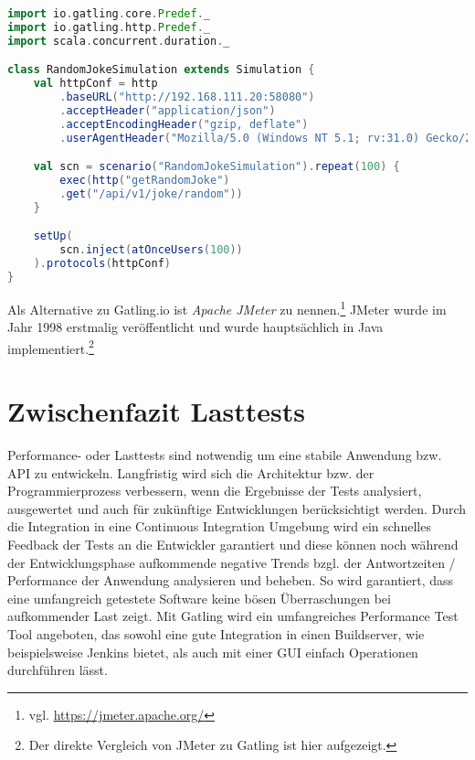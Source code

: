 \begin{minipage}{\linewidth}
\begin{lstlisting}[frame=single,caption=Testabfrage auf Schnittstelle in Gatling, label=testCodingSample, language=Scala]
import io.gatling.core.Predef._
import io.gatling.http.Predef._
import scala.concurrent.duration._

class RandomJokeSimulation extends Simulation {
    val httpConf = http
        .baseURL("http://192.168.111.20:58080")
        .acceptHeader("application/json")
        .acceptEncodingHeader("gzip, deflate")
        .userAgentHeader("Mozilla/5.0 (Windows NT 5.1; rv:31.0) Gecko/20100101 Firefox/31.0")

    val scn = scenario("RandomJokeSimulation").repeat(100) {
        exec(http("getRandomJoke")
        .get("/api/v1/joke/random"))
    }    

    setUp(
        scn.inject(atOnceUsers(100))
    ).protocols(httpConf)
}
\end{lstlisting}
\end{minipage}
Als Alternative zu Gatling.io ist \textit{Apache JMeter} zu nennen.\footnote{{} vgl. \url{https://jmeter.apache.org/}} JMeter wurde im Jahr 1998 erstmalig veröffentlicht und wurde hauptsächlich in Java implementiert.\footnote{{} Der direkte Vergleich von JMeter zu Gatling ist hier aufgezeigt.\cite{JMetervs63:online}}

\section{Zwischenfazit Lasttests}

Performance- oder Lasttests sind notwendig um eine stabile Anwendung bzw. API zu entwickeln.
Langfristig wird sich die Architektur bzw. der Programmierprozess verbessern, wenn die Ergebnisse der Tests analysiert, ausgewertet und auch für zukünftige Entwicklungen berücksichtigt werden. Durch die Integration in eine Continuous Integration Umgebung wird ein schnelles Feedback der Tests an die Entwickler garantiert und diese können noch während der Entwicklungsphase aufkommende negative Trends bzgl. der Antwortzeiten / Performance der Anwendung analysieren und beheben. So wird garantiert, dass eine umfangreich getestete Software keine bösen Überraschungen bei aufkommender Last zeigt. Mit Gatling wird ein umfangreiches Performance Test Tool angeboten, das sowohl eine gute Integration in einen Buildserver, wie beispielsweise Jenkins bietet, als auch mit einer \ac{GUI} einfach Operationen durchführen lässt.


